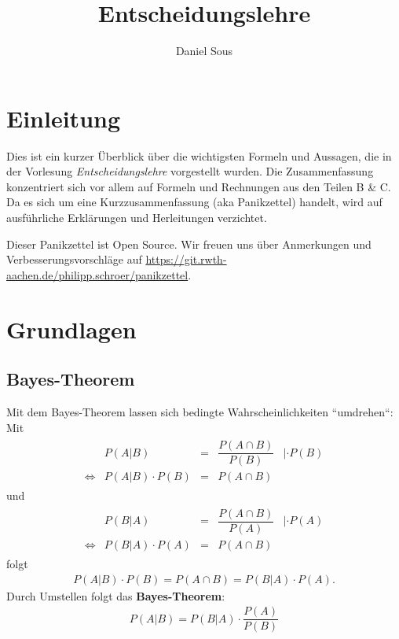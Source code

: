 \documentclass{panikzettel}
\title{Entscheidungslehre}
\author{Daniel Sous}
\begin{document}
\maketitle

\tableofcontents

\section{Einleitung}

Dies ist ein kurzer Überblick über die wichtigsten Formeln und Aussagen, die in der Vorlesung \textit{Entscheidungslehre} \cite{vonNitzsch:skript} vorgestellt wurden. Die Zusammenfassung konzentriert sich vor allem auf Formeln und Rechnungen aus den Teilen B \& C. Da es sich um eine Kurzzusammenfassung (aka Panikzettel) handelt, wird auf ausführliche Erklärungen und Herleitungen verzichtet.

Dieser Panikzettel ist Open Source.
Wir freuen uns über Anmerkungen und Verbesserungsvorschläge auf \url{https://git.rwth-aachen.de/philipp.schroer/panikzettel}.

\section{Grundlagen}

\subsection{Bayes-Theorem}
Mit dem Bayes-Theorem lassen sich bedingte Wahrscheinlichkeiten ``umdrehen``:\\
Mit
\begin{align*}
\begin{array}{rrcll}
& P(A | B) & =  & \dfrac{P(A \cap B)}{P(B)} & |\cdot P(B) \\
\Leftrightarrow & P (A|B) \cdot P(B) & = & P(A \cap B)
\end{array}
\end{align*}
und
\begin{align*}
\begin{array}{rrcll}
& P(B | A) & =  & \dfrac{P(A \cap B)}{P(A)} & |\cdot P(A) \\
\Leftrightarrow & P (B|A) \cdot P(A) & = & P(A \cap B)
\end{array}
\end{align*}
folgt
\begin{align*}
	P (A|B) \cdot P(B) = P(A \cap B) = P (B|A) \cdot P(A).
\end{align*}
Durch Umstellen folgt das \textbf{Bayes-Theorem}:
\begin{align*}
	P(A|B) = P(B|A) \cdot \dfrac{P(A)}{P(B)}
\end{align*}
\end{document}
